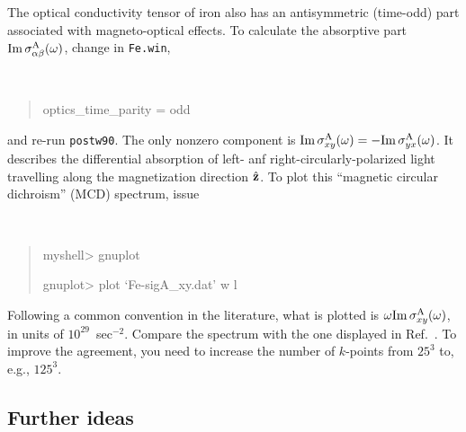 \documentclass[a4paper,11pt,twoside]{article}
\begin{document}
The optical conductivity tensor of iron also has an antisymmetric
(time-odd) part associated with magneto-optical effects. To calculate
the absorptive part ${\rm Im}\,\sigma^{\rm A}_{\alpha\beta}(\omega)$,
change in {\tt Fe.win},
%
{\tt
\begin{quote}
optics\_time\_parity = odd
\end{quote} }
%
and re-run {\tt postw90}. The only nonzero component is ${\rm
  Im}\,\sigma^{\rm A}_{xy}(\omega)=-{\rm Im}\,\sigma^{\rm
  A}_{yx}(\omega)$.  It describes the differential absorption of left-
anf right-circularly-polarized light travelling along the
magnetization direction $\hat{\bf z}$. To plot this
``magnetic circular dichroism'' (MCD) spectrum, issue
%
{\tt
\begin{quote} myshell> gnuplot

gnuplot> plot `Fe-sigA\_xy.dat' w l
\end{quote} }
%
Following a common convention in the literature, what is plotted is
$\omega{\rm Im}\,\sigma^{\rm A}_{xy}(\omega)$, in units of
$10^{29}$~sec$^{-2}$. Compare the spectrum with the one displayed in
Ref.~\cite{yao-prl04}. To improve the agreement, you need to increase
the number of $k$-points from $25^3$ to, e.g., $125^3$.


\newpage

\subsection*{Further ideas}
\end{document}
